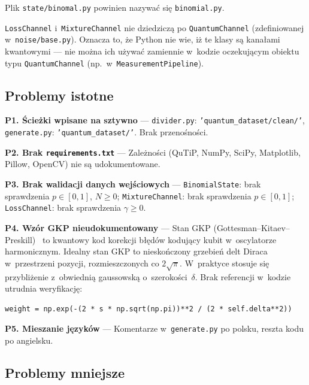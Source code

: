 \documentclass[12pt,a4paper]{article}
\begin{document}
\begin{warningbox}
Plik \texttt{state/binomal.py} powinien nazywać się \texttt{binomial.py}.
\end{warningbox}

\begin{warningbox}
\texttt{LossChannel} i~\texttt{MixtureChannel} nie dziedziczą po \texttt{QuantumChannel} (zdefiniowanej w~\texttt{noise/base.py}). Oznacza to, że Python nie wie, iż te klasy są kanałami kwantowymi --- nie można ich używać zamiennie w~kodzie oczekującym obiektu typu \texttt{QuantumChannel} (np.~w~\texttt{MeasurementPipeline}).
\end{warningbox}

\subsection{Problemy istotne}

\textbf{P1. Ścieżki wpisane na sztywno} --- \texttt{divider.py}: \texttt{'quantum\_dataset/clean/'}, \texttt{generate.py}: \texttt{'quantum\_dataset/'}. Brak przenośności.

\textbf{P2. Brak \texttt{requirements.txt}} --- Zależności (QuTiP, NumPy, SciPy, Matplotlib, Pillow, OpenCV) nie są udokumentowane.

\textbf{P3. Brak walidacji danych wejściowych} --- \texttt{BinomialState}: brak sprawdzenia $p \in [0,1]$, $N \geq 0$; \texttt{MixtureChannel}: brak sprawdzenia $p \in [0,1]$; \texttt{LossChannel}: brak sprawdzenia $\gamma \geq 0$.

\textbf{P4. Wzór GKP nieudokumentowany} --- Stan GKP (Gottesman--Kitaev--Preskill)~\cite{gottesman2001} to kwantowy kod korekcji błędów kodujący kubit w~oscylatorze harmonicznym. Idealny stan GKP to nieskończony grzebień delt Diraca w~przestrzeni pozycji, rozmieszczonych co $2\sqrt{\pi}$. W~praktyce stosuje się przybliżenie z~obwiednią gaussowską o~szerokości~$\delta$. Brak referencji w~kodzie utrudnia weryfikację:
\begin{lstlisting}[numbers=none, caption={Nieudokumentowany wzór GKP w \texttt{gkp.py:25}.}]
weight = np.exp(-(2 * s * np.sqrt(np.pi))**2 / (2 * self.delta**2))
\end{lstlisting}

\textbf{P5. Mieszanie języków} --- Komentarze w~\texttt{generate.py} po polsku, reszta kodu po angielsku.

\subsection{Problemy mniejsze}
\end{document}
